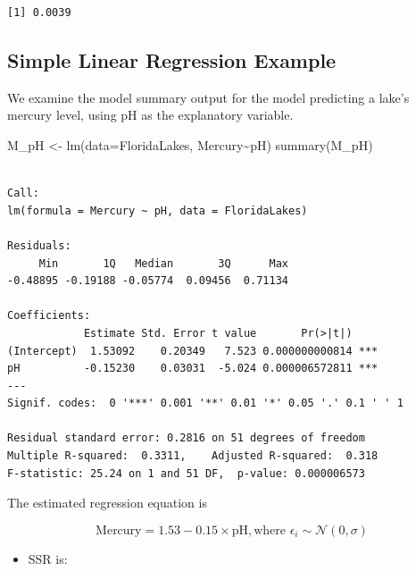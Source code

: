 \documentclass[
  letterpaper,
  DIV=11,
  numbers=noendperiod]{scrreprt}
\newenvironment{Shaded}{\begin{snugshade}}{\end{snugshade}}
\newcommand{\AttributeTok}[1]{\textcolor[rgb]{0.40,0.45,0.13}{#1}}
\newcommand{\DecValTok}[1]{\textcolor[rgb]{0.68,0.00,0.00}{#1}}
\newcommand{\FunctionTok}[1]{\textcolor[rgb]{0.28,0.35,0.67}{#1}}
\newcommand{\NormalTok}[1]{\textcolor[rgb]{0.00,0.23,0.31}{#1}}
\newcommand{\OtherTok}[1]{\textcolor[rgb]{0.00,0.23,0.31}{#1}}
\newcommand{\SpecialCharTok}[1]{\textcolor[rgb]{0.37,0.37,0.37}{#1}}
\providecommand{\tightlist}{%
  \setlength{\itemsep}{0pt}\setlength{\parskip}{0pt}}\usepackage{longtable,booktabs,array}
\begin{document}
\begin{verbatim}
[1] 0.0039
\end{verbatim}

\subsection{Simple Linear Regression
Example}\label{simple-linear-regression-example}

We examine the model summary output for the model predicting a lake's
mercury level, using pH as the explanatory variable.

\begin{Shaded}
\begin{Highlighting}[]
\NormalTok{M\_pH }\OtherTok{\textless{}{-}} \FunctionTok{lm}\NormalTok{(}\AttributeTok{data=}\NormalTok{FloridaLakes, Mercury}\SpecialCharTok{\textasciitilde{}}\NormalTok{pH)}
\FunctionTok{summary}\NormalTok{(M\_pH)}
\end{Highlighting}
\end{Shaded}

\begin{verbatim}

Call:
lm(formula = Mercury ~ pH, data = FloridaLakes)

Residuals:
     Min       1Q   Median       3Q      Max 
-0.48895 -0.19188 -0.05774  0.09456  0.71134 

Coefficients:
            Estimate Std. Error t value       Pr(>|t|)    
(Intercept)  1.53092    0.20349   7.523 0.000000000814 ***
pH          -0.15230    0.03031  -5.024 0.000006572811 ***
---
Signif. codes:  0 '***' 0.001 '**' 0.01 '*' 0.05 '.' 0.1 ' ' 1

Residual standard error: 0.2816 on 51 degrees of freedom
Multiple R-squared:  0.3311,    Adjusted R-squared:  0.318 
F-statistic: 25.24 on 1 and 51 DF,  p-value: 0.000006573
\end{verbatim}

The estimated regression equation is

\[ \text{Mercury} = 1.53 - 0.15 \times\text{pH}, \text{where } \epsilon_i\sim\mathcal{N}(0, \sigma) \]

\begin{itemize}
\tightlist
\item
  SSR is:
\end{itemize}

\begin{Shaded}
\end{Shaded}
\end{document}
